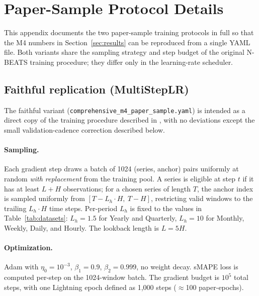 \documentclass{article}
\begin{document}
\begin{ack}
\end{ack}


{
\small


}



\appendix

\section{Paper-Sample Protocol Details}
\label{app:protocols}

This appendix documents the two paper-sample training protocols in full so that the M4 numbers in Section~\ref{sec:results} can be reproduced from a single YAML file. Both variants share the sampling strategy and step budget of the original N-BEATS training procedure; they differ only in the learning-rate scheduler.

\subsection{Faithful replication (MultiStepLR)}

The faithful variant (\texttt{comprehensive\_m4\_paper\_sample.yaml}) is intended as a direct copy of the training procedure described in \citet[Section~5.2 and Appendix~D]{oreshkin2020nbeats}, with no deviations except the small validation-cadence correction described below.

\paragraph{Sampling.} Each gradient step draws a batch of 1024 (series, anchor) pairs uniformly at random \emph{with replacement} from the training pool. A series is eligible at step $t$ if it has at least $L + H$ observations; for a chosen series of length $T$, the anchor index is sampled uniformly from $[T - L_h \cdot H,\ T - H]$, restricting valid windows to the trailing $L_h \cdot H$ time steps. Per-period $L_h$ is fixed to the values in Table~\ref{tab:datasets}: $L_h = 1.5$ for Yearly and Quarterly, $L_h = 10$ for Monthly, Weekly, Daily, and Hourly. The lookback length is $L = 5H$.

\paragraph{Optimization.} Adam with $\eta_0 = 10^{-3}$, $\beta_1 = 0.9$, $\beta_2 = 0.999$, no weight decay. sMAPE loss is computed per-step on the 1024-window batch. The gradient budget is $10^5$ total steps, with one Lightning epoch defined as 1{,}000 steps ($\approx$100 paper-epochs).
\end{document}
